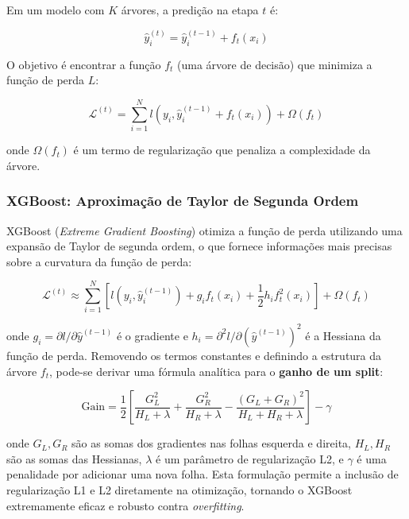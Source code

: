 \documentclass[12pt, a4paper, oneside]{report}
\begin{document}
Em um modelo com $K$ árvores, a predição na etapa $t$ é:

\begin{equation}
    \hat{y}_i^{(t)} = \hat{y}_i^{(t-1)} + f_t(x_i)
\end{equation}

O objetivo é encontrar a função $f_t$ (uma árvore de decisão) que minimiza a função de perda $L$:

\begin{equation}
    \mathcal{L}^{(t)} = \sum_{i=1}^N l(y_i, \hat{y}_i^{(t-1)} + f_t(x_i)) + \Omega(f_t)
\end{equation}

onde $\Omega(f_t)$ é um termo de regularização que penaliza a complexidade da árvore.

\subsubsection{XGBoost: Aproximação de Taylor de Segunda Ordem}

XGBoost (\textit{Extreme Gradient Boosting}) \cite{chen2016} otimiza a função de perda utilizando uma expansão de Taylor de segunda ordem, o que fornece informações mais precisas sobre a curvatura da função de perda:

\begin{equation}
    \mathcal{L}^{(t)} \approx \sum_{i=1}^N \left[ l(y_i, \hat{y}_i^{(t-1)}) + g_i f_t(x_i) + \frac{1}{2} h_i f_t^2(x_i) \right] + \Omega(f_t)
\end{equation}

onde $g_i = \partial l / \partial \hat{y}^{(t-1)}$ é o gradiente e $h_i = \partial^2 l / \partial (\hat{y}^{(t-1)})^2$ é a Hessiana da função de perda. Removendo os termos constantes e definindo a estrutura da árvore $f_t$, pode-se derivar uma fórmula analítica para o \textbf{ganho de um split}:

\begin{equation}
    \text{Gain} = \frac{1}{2} \left[ \frac{G_L^2}{H_L + \lambda} + \frac{G_R^2}{H_R + \lambda} - \frac{(G_L+G_R)^2}{H_L+H_R+\lambda} \right] - \gamma
\end{equation}

onde $G_L, G_R$ são as somas dos gradientes nas folhas esquerda e direita, $H_L, H_R$ são as somas das Hessianas, $\lambda$ é um parâmetro de regularização L2, e $\gamma$ é uma penalidade por adicionar uma nova folha. Esta formulação permite a inclusão de regularização L1 e L2 diretamente na otimização, tornando o XGBoost extremamente eficaz e robusto contra \textit{overfitting}.
\end{document}
